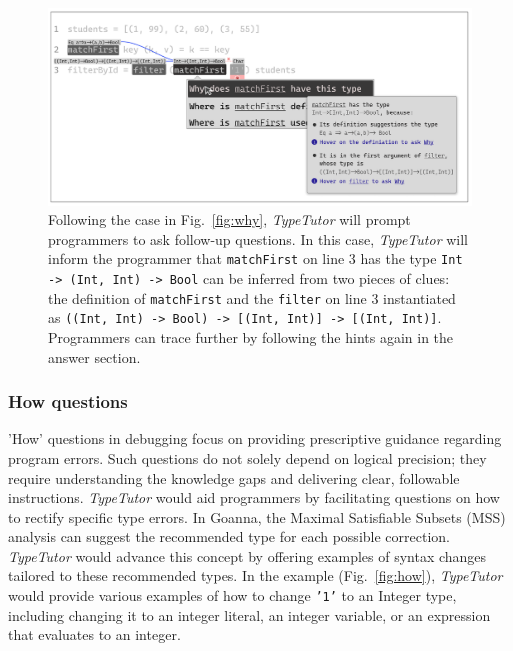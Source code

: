 \begin{figure}[hbt]
  \includegraphics[width=\linewidth]{FollowUp}
  \caption[An example of \textit{TypeTutor} providing further explanation based on previous response (follow-up questions)]{
    \label{fig:follow-up}
     Following the case in Fig.~\ref{fig:why}, \textit{TypeTutor} will prompt programmers to ask follow-up questions. In this case, \textit{TypeTutor} will inform the programmer that \texttt{matchFirst} on line 3 has the type \texttt{Int -> (Int, Int) -> Bool} can be inferred from two pieces of clues:  the definition of \texttt{matchFirst} and the \texttt{filter} on line 3 instantiated as \texttt{((Int, Int) -> Bool) -> [(Int, Int)] -> [(Int, Int)]}. Programmers can trace further by following the hints again in the answer section.
    }
\end{figure}

\subsubsection*{How questions}

'How' questions in debugging focus on providing prescriptive guidance regarding program errors. Such questions do not solely depend on logical precision; they require understanding the knowledge gaps and delivering clear, followable instructions. \textit{TypeTutor} would aid programmers by facilitating questions on how to rectify specific type errors. In Goanna, the Maximal Satisfiable Subsets (MSS) analysis can suggest the recommended type for each possible correction. \textit{TypeTutor} would advance this concept by offering examples of syntax changes tailored to these recommended types. In the example (Fig.~\ref{fig:how}), \textit{TypeTutor} would provide various examples of how to change \texttt{'1'} to an Integer type, including changing it to an integer literal, an integer variable, or an expression that evaluates to an integer. 



